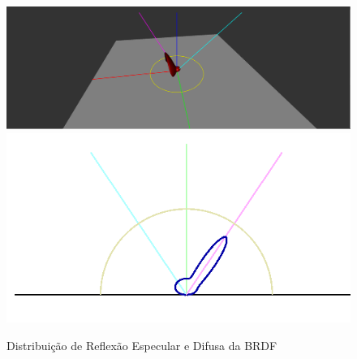 \begin{figure}[H]
    \caption{\small{Distribuição de Reflexão Especular e Difusa da BRDF}}\label{fig-ashikhmin-shirley-close-to-original-eqlang}
    \vspace{42px}
  \includegraphics[width=\linewidth]{./Imagens/brdfs/ashikhmin-shirley-close-to-original-3D-plot}
\endminipage\hfill
{}
  \includegraphics[width=\linewidth]{./Imagens/brdfs/ashikhmin-shirley-close-to-original-polar-plot.png}
\endminipage\hfill
\end{figure}

